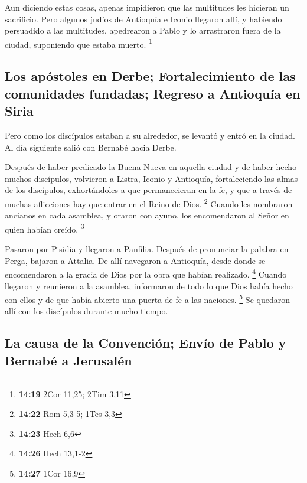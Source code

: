  Aun diciendo estas cosas, apenas impidieron que las
multitudes les hicieran un sacrificio.  Pero algunos
judíos de Antioquía e Iconio llegaron allí, y habiendo persuadido a las
multitudes, apedrearon a Pablo y lo arrastraron fuera de la ciudad,
suponiendo que estaba muerto. \footnote{\textbf{14:19} 2Cor 11,25; 2Tim
  3,11}

\hypertarget{los-apuxf3stoles-en-derbe-fortalecimiento-de-las-comunidades-fundadas-regreso-a-antioquuxeda-en-siria}{%
\subsection{Los apóstoles en Derbe; Fortalecimiento de las comunidades
fundadas; Regreso a Antioquía en
Siria}\label{los-apuxf3stoles-en-derbe-fortalecimiento-de-las-comunidades-fundadas-regreso-a-antioquuxeda-en-siria}}

 Pero como los discípulos estaban a su alrededor, se
levantó y entró en la ciudad. Al día siguiente salió con Bernabé hacia
Derbe.

 Después de haber predicado la Buena Nueva en aquella
ciudad y de haber hecho muchos discípulos, volvieron a Listra, Iconio y
Antioquía,  fortaleciendo las almas de los discípulos,
exhortándoles a que permanecieran en la fe, y que a través de muchas
aflicciones hay que entrar en el Reino de Dios. \footnote{\textbf{14:22}
  Rom 5,3-5; 1Tes 3,3}  Cuando les nombraron ancianos en
cada asamblea, y oraron con ayuno, los encomendaron al Señor en quien
habían creído. \footnote{\textbf{14:23} Hech 6,6}

 Pasaron por Pisidia y llegaron a Panfilia.
 Después de pronunciar la palabra en Perga, bajaron a
Attalia.  De allí navegaron a Antioquía, desde donde se
encomendaron a la gracia de Dios por la obra que habían realizado.
\footnote{\textbf{14:26} Hech 13,1-2}  Cuando llegaron y
reunieron a la asamblea, informaron de todo lo que Dios había hecho con
ellos y de que había abierto una puerta de fe a las naciones.
\footnote{\textbf{14:27} 1Cor 16,9}  Se quedaron allí con
los discípulos durante mucho tiempo.

\hypertarget{la-causa-de-la-convenciuxf3n-envuxedo-de-pablo-y-bernabuxe9-a-jerusaluxe9n}{%
\subsection{La causa de la Convención; Envío de Pablo y Bernabé a
Jerusalén}\label{la-causa-de-la-convenciuxf3n-envuxedo-de-pablo-y-bernabuxe9-a-jerusaluxe9n}}

